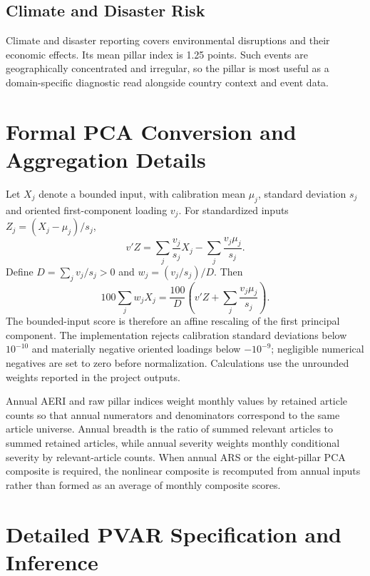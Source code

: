 \documentclass[11pt]{article}
\begin{document}
\subsection{Climate and Disaster Risk}
Climate and disaster reporting covers environmental disruptions and their economic effects. Its mean pillar index is 1.25 points. Such events are geographically concentrated and irregular, so the pillar is most useful as a domain-specific diagnostic read alongside country context and event data.

\section{Formal PCA Conversion and Aggregation Details}
Let $X_j$ denote a bounded input, with calibration mean $\mu_j$, standard deviation $s_j$ and oriented first-component loading $v_j$. For standardized inputs $Z_j=(X_j-\mu_j)/s_j$,
\begin{equation}
 v'Z=\sum_j \frac{v_j}{s_j}X_j-\sum_j\frac{v_j\mu_j}{s_j}.
\end{equation}
Define $D=\sum_j v_j/s_j>0$ and $w_j=(v_j/s_j)/D$. Then
\begin{equation}
100\sum_jw_jX_j=\frac{100}{D}\left(v'Z+\sum_j\frac{v_j\mu_j}{s_j}\right).
\end{equation}
The bounded-input score is therefore an affine rescaling of the first principal component. The implementation rejects calibration standard deviations below $10^{-10}$ and materially negative oriented loadings below $-10^{-9}$; negligible numerical negatives are set to zero before normalization. Calculations use the unrounded weights reported in the project outputs.

Annual AERI and raw pillar indices weight monthly values by retained article counts so that annual numerators and denominators correspond to the same article universe. Annual breadth is the ratio of summed relevant articles to summed retained articles, while annual severity weights monthly conditional severity by relevant-article counts. When annual ARS or the eight-pillar PCA composite is required, the nonlinear composite is recomputed from annual inputs rather than formed as an average of monthly composite scores.

\section{Detailed PVAR Specification and Inference}\label{app:pvar}

\end{document}
